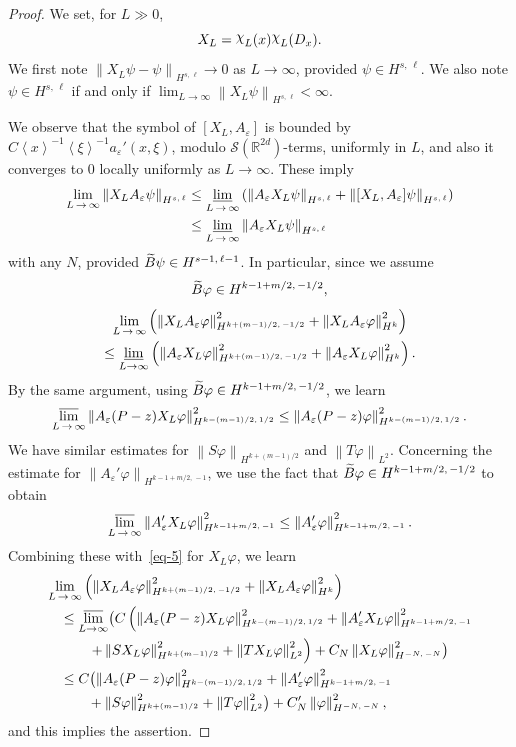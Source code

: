 \documentclass[AHL,Unicode,longabstracts,published]{cedram}
\newcommand*\e{\varepsilon}
\newcommand*\f{\varphi}
\newcommand*\g{\psi}
\renewcommand*\i{\mbox{\raisebox{.5ex}{$\chi$}}}
\newcommand*\x{\xi}
\newcommand*\re{\mathbb{R}}
\newcommand{\clS}{\mathcal{S}}
\newcommand{\jap}[1]{\left\langle #1 \right\rangle}
\newcommand{\norm}[1]{\left\| #1 \right\|}
\newcommand{\bigpare}[1]{\bigl(#1\bigr)}
\let\oldtilde\tilde
\renewcommand*{\tilde}[1]{\mathchoice{\widetilde{#1}}{\widetilde{#1}}{\oldtilde{#1}}{\oldtilde{#1}}}
\begin{document}
\begin{proof}
We set, for $L\gg 0$,
\[
X_L =\i_L(x)\i_L(D_x).
\]
We first note $\norm{X_L\g-\g}_{H^{s,\,\ell}}\to 0$ as $L\to\infty$, provided $\g\in H^{s,\,\ell}$. We also note $\g\in H^{s,\,\ell}$ if and only if $\lim_{L\to\infty}\norm{X_L\g}_{H^{s,\,\ell}}<\infty$.

We observe that the symbol of $[X_L,A_\e]$ is bounded by $C\jap{x}^{-1}\jap{\x}^{-1}a_\e'(x,\x)$, modulo $\clS(\re^{2d})$-terms, uniformly in $L$, and also it converges to 0 locally uniformly as $L\to\infty$. These imply
\begin{align*}
\lim_{L\,\to\,\infty} \norm{X_L A_\e\g}_{H^{s,\,\ell}} &\leq \varliminf_{L\,\to\,\infty} \left(\norm{A_\e X_L \g}_{H^{s,\,\ell}} + \norm{[X_L,A_\e]\g}_{H^{s,\,\ell}} \right)\\
&\leq \varliminf_{L\,\to\,\infty} \norm{A_\e X_L \g}_{H^{s,\,\ell}}
\end{align*}
with any $N$, provided $\tilde{B}\g\in H^{s-1,\,\ell-1}$. In particular, since we assume
\[
\tilde{B}\f\in H^{k-1+m/2,\,-1/2},
\]
\begin{multline*}
\lim_{L\,\to\,\infty} \left(\norm{X_L A_\e\f}_{H^{k+(m-1)/2,\,-1/2}}^2 +\norm{X_L A_\e\f}_{H^k}^2\right)\\
\leq \varliminf_{L\to\infty}\left(\norm{A_\e X_L \f}_{H^{k+(m-1)/2,\,-1/2}}^2 +\norm{A_\e X_L \f}_{H^k}^2\right).
\end{multline*}
By the same argument, using $\tilde{B}\f\in H^{k-1+m/2,\,-1/2}$, we learn
\[
\varlimsup_{L\,\to\,\infty} \norm{A_\e (P-z) X_L\f}_{H^{k-(m-1)/2,\,1/2}}^2
\leq \norm{A_\e (P-z)\f}_{H^{k-(m-1)/2,\,1/2}}^2.
\]
We have similar estimates for $\norm{S\f}_{H^{k+(m-1)/2}}$ and $\norm{T\f}_{L^2}$. Concerning the estimate for $\norm{A_\e'\f}_{H^{k-1+m/2,\,-1}}$, we use the fact that $\tilde B\f\in H^{k-1+m/2,\,-1/2}$ to obtain
\[
\varlimsup_{L\,\to\,\infty} \norm{A_\e' X_L\f}_{H^{k-1+m/2,\,-1}}^2
\leq \norm{A'_\e\f}_{H^{k-1+m/2,\,-1}}^2.
\]
Combining these with~\eqref{eq-5} for $X_L\f$, we learn
\begin{align*}
& \lim_{L\,\to\,\infty} \left(\norm{X_L A_\e\f}_{H^{k+(m-1)/2,\,-1/2}}^2 +\norm{X_L A_\e\f}_{H^k}^2\right)\\
&\quad \leq \varlimsup_{L\to\infty} \bigpare{ C\left(\norm{A_\e (P-z) X_L\f}_{H^{k-(m-1)/2,\,1/2}}^2 +\norm{A_\e'X_L \f}_{H^{k-1+m/2,\,-1}}^2 \right.\\
&\left.\quad\quad\quad + \norm{SX_L \f}_{H^{k+(m-1)/2}}^2 +\norm{TX_L \f}_{L^2}^2\right) +C_N \norm{X_L \f}_{H^{-N,\,-N}}^2} \\
&\quad \leq C\bigpare{\norm{A_\e(P-z)\f}_{H^{k-(m-1)/2,\,1/2}}^2 +\norm{A'_\e\f}_{H^{k-1+m/2,\,-1}}^2 \\
&\quad \quad\quad+\norm{S\f}_{H^{k+(m-1)/2}}^2 +\norm{T\f}_{L^2}^2} +C'_N \norm{\f}_{H^{-N,\,-N}}^2,
\end{align*}
and this implies the assertion.
\end{proof}
\end{document}
